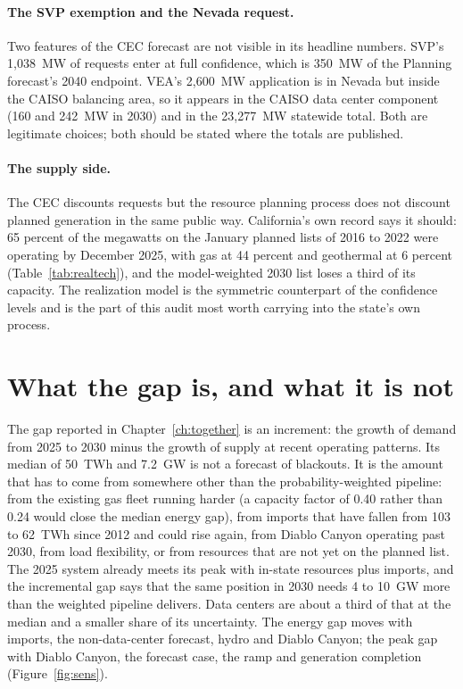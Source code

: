 \paragraph{The SVP exemption and the Nevada request.} Two features of the CEC forecast are not visible in its headline numbers. SVP's 1,038~MW of requests enter at full confidence, which is 350~MW of the Planning forecast's 2040 endpoint. VEA's 2,600~MW application is in Nevada but inside the CAISO balancing area, so it appears in the CAISO data center component (160 and 242~MW in 2030) and in the 23,277~MW statewide total. Both are legitimate choices; both should be stated where the totals are published.

\paragraph{The supply side.} The CEC discounts requests but the resource planning process does not discount planned generation in the same public way. California's own record says it should: 65 percent of the megawatts on the January planned lists of 2016 to 2022 were operating by December 2025, with gas at 44 percent and geothermal at 6 percent (Table~\ref{tab:realtech}), and the model-weighted 2030 list loses a third of its capacity. The realization model is the symmetric counterpart of the confidence levels and is the part of this audit most worth carrying into the state's own process.

\section{What the gap is, and what it is not}
\label{sec:gapmeaning}

The gap reported in Chapter~\ref{ch:together} is an increment: the growth of demand from 2025 to 2030 minus the growth of supply at recent operating patterns. Its median of 50~TWh and 7.2~GW is not a forecast of blackouts. It is the amount that has to come from somewhere other than the probability-weighted pipeline: from the existing gas fleet running harder (a capacity factor of 0.40 rather than 0.24 would close the median energy gap), from imports that have fallen from 103 to 62~TWh since 2012 and could rise again, from Diablo Canyon operating past 2030, from load flexibility, or from resources that are not yet on the planned list. The 2025 system already meets its peak with in-state resources plus imports, and the incremental gap says that the same position in 2030 needs 4 to 10~GW more than the weighted pipeline delivers. Data centers are about a third of that at the median and a smaller share of its uncertainty. The energy gap moves with imports, the non-data-center forecast, hydro and Diablo Canyon; the peak gap with Diablo Canyon, the forecast case, the ramp and generation completion (Figure~\ref{fig:sens}).

